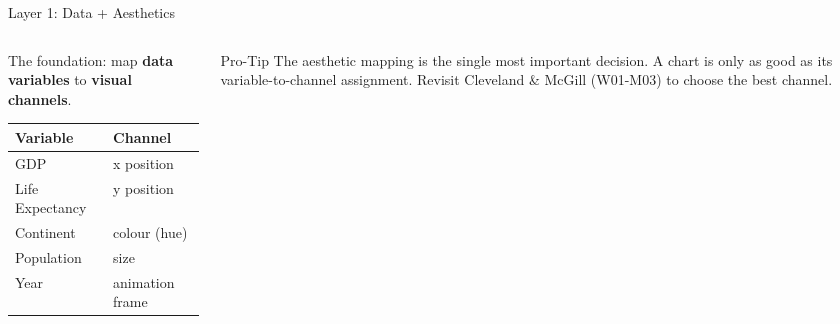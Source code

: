 \documentclass[10pt]{beamer}
\begin{document}
\begin{frame}{Layer 1: Data + Aesthetics}
  \begin{columns}[T]
    \begin{column}{0.55\textwidth}
      The foundation: map \textbf{data variables} to \textbf{visual channels}.

      \vspace{4pt}
      \centering
      \begin{tabular}{ll}
        \toprule
        \textbf{Variable} & \textbf{Channel} \\
        \midrule
        GDP          & x position \\
        Life Expectancy & y position \\
        Continent    & colour (hue) \\
        Population   & size \\
        Year         & animation frame \\
        \bottomrule
      \end{tabular}
    \end{column}
    \begin{column}{0.42\textwidth}
      \begin{alertblock}{Pro-Tip}
        The aesthetic mapping is the single
        most important decision. A chart is
        only as good as its variable-to-channel
        assignment. Revisit Cleveland \& McGill
        (W01-M03) to choose the best channel.
      \end{alertblock}
    \end{column}
  \end{columns}
\end{frame}
\end{document}
